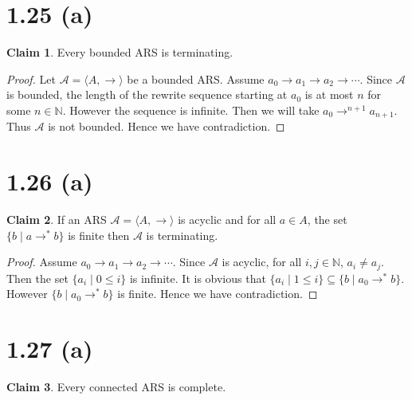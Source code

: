 \documentclass[autodetect-enginem]{article}
\title{}
\author{}
\date{}
\theoremstyle{plain}
\theoremstyle{definition}
\newtheorem*{claim*}{Claim}
\begin{document}
\section*{1.25 (a)}

\begin{claim*}
    Every bounded ARS is terminating.
\end{claim*}

\begin{proof}
    Let $\mathcal{A} = \langle A, \to \rangle$ be a bounded ARS.
    Assume $a_0 \to a_1 \to a_2 \to \cdots$.
    Since $\mathcal{A}$ is bounded, the length of the rewrite sequence starting at $a_0$
    is at most $n$ for some $n \in \mathbb{N}$.
    However the sequence is infinite. Then we will take $a_0 \to^{n+1} a_{n+1}$.
    Thus $\mathcal{A}$ is not bounded. Hence we have contradiction.
\end{proof}

\section*{1.26 (a)}

\begin{claim*}
    If an ARS $\mathcal{A} = \langle A, \to \rangle$ is acyclic and for all $a\in A$, the set $\{b \mid a \to^* b\}$
    is finite then $\mathcal{A}$ is terminating.
\end{claim*}

\begin{proof}
    Assume $a_0 \to a_1 \to a_2 \to \cdots$.
    Since $\mathcal{A}$ is acyclic, for all $i,j \in \mathbb{N}$, $a_i \neq a_j$.
    Then the set $\{ a_i \mid 0 \leq i \}$ is infinite.
    It is obvious that $\{ a_i \mid 1 \leq i \} \subseteq \{b \mid a_0 \to^* b\}$.
    However $\{b \mid a_0 \to^* b\}$ is finite. Hence we have contradiction.
\end{proof}

\section*{1.27 (a)}

\begin{claim*}
    Every connected ARS is complete.
\end{claim*}
\end{document}
